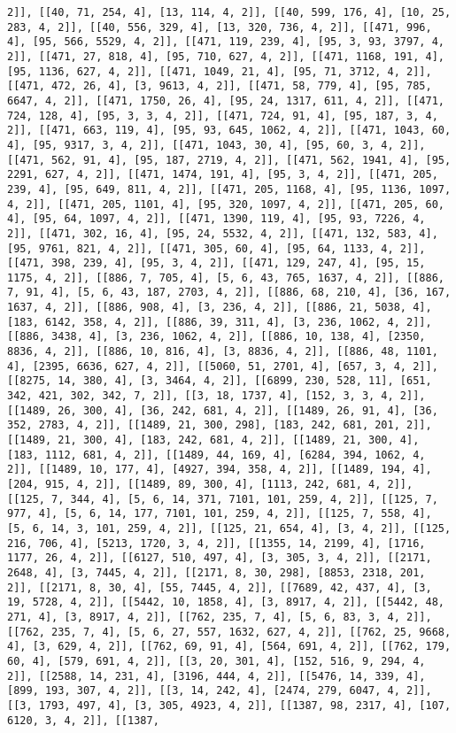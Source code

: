 \documentclass[12pt,fleqn]{article}\usepackage{../../common}
\begin{document}
\begin{verbatim}
2]], [[40, 71, 254, 4], [13, 114, 4, 2]], [[40, 599, 176, 4], [10, 25, 283, 4, 2]], [[40, 556, 329, 4], [13, 320, 736, 4, 2]], [[471, 996, 4], [95, 566, 5529, 4, 2]], [[471, 119, 239, 4], [95, 3, 93, 3797, 4, 2]], [[471, 27, 818, 4], [95, 710, 627, 4, 2]], [[471, 1168, 191, 4], [95, 1136, 627, 4, 2]], [[471, 1049, 21, 4], [95, 71, 3712, 4, 2]], [[471, 472, 26, 4], [3, 9613, 4, 2]], [[471, 58, 779, 4], [95, 785, 6647, 4, 2]], [[471, 1750, 26, 4], [95, 24, 1317, 611, 4, 2]], [[471, 724, 128, 4], [95, 3, 3, 4, 2]], [[471, 724, 91, 4], [95, 187, 3, 4, 2]], [[471, 663, 119, 4], [95, 93, 645, 1062, 4, 2]], [[471, 1043, 60, 4], [95, 9317, 3, 4, 2]], [[471, 1043, 30, 4], [95, 60, 3, 4, 2]], [[471, 562, 91, 4], [95, 187, 2719, 4, 2]], [[471, 562, 1941, 4], [95, 2291, 627, 4, 2]], [[471, 1474, 191, 4], [95, 3, 4, 2]], [[471, 205, 239, 4], [95, 649, 811, 4, 2]], [[471, 205, 1168, 4], [95, 1136, 1097, 4, 2]], [[471, 205, 1101, 4], [95, 320, 1097, 4, 2]], [[471, 205, 60, 4], [95, 64, 1097, 4, 2]], [[471, 1390, 119, 4], [95, 93, 7226, 4, 2]], [[471, 302, 16, 4], [95, 24, 5532, 4, 2]], [[471, 132, 583, 4], [95, 9761, 821, 4, 2]], [[471, 305, 60, 4], [95, 64, 1133, 4, 2]], [[471, 398, 239, 4], [95, 3, 4, 2]], [[471, 129, 247, 4], [95, 15, 1175, 4, 2]], [[886, 7, 705, 4], [5, 6, 43, 765, 1637, 4, 2]], [[886, 7, 91, 4], [5, 6, 43, 187, 2703, 4, 2]], [[886, 68, 210, 4], [36, 167, 1637, 4, 2]], [[886, 908, 4], [3, 236, 4, 2]], [[886, 21, 5038, 4], [183, 6142, 358, 4, 2]], [[886, 39, 311, 4], [3, 236, 1062, 4, 2]], [[886, 3438, 4], [3, 236, 1062, 4, 2]], [[886, 10, 138, 4], [2350, 8836, 4, 2]], [[886, 10, 816, 4], [3, 8836, 4, 2]], [[886, 48, 1101, 4], [2395, 6636, 627, 4, 2]], [[5060, 51, 2701, 4], [657, 3, 4, 2]], [[8275, 14, 380, 4], [3, 3464, 4, 2]], [[6899, 230, 528, 11], [651, 342, 421, 302, 342, 7, 2]], [[3, 18, 1737, 4], [152, 3, 3, 4, 2]], [[1489, 26, 300, 4], [36, 242, 681, 4, 2]], [[1489, 26, 91, 4], [36, 352, 2783, 4, 2]], [[1489, 21, 300, 298], [183, 242, 681, 201, 2]], [[1489, 21, 300, 4], [183, 242, 681, 4, 2]], [[1489, 21, 300, 4], [183, 1112, 681, 4, 2]], [[1489, 44, 169, 4], [6284, 394, 1062, 4, 2]], [[1489, 10, 177, 4], [4927, 394, 358, 4, 2]], [[1489, 194, 4], [204, 915, 4, 2]], [[1489, 89, 300, 4], [1113, 242, 681, 4, 2]], [[125, 7, 344, 4], [5, 6, 14, 371, 7101, 101, 259, 4, 2]], [[125, 7, 977, 4], [5, 6, 14, 177, 7101, 101, 259, 4, 2]], [[125, 7, 558, 4], [5, 6, 14, 3, 101, 259, 4, 2]], [[125, 21, 654, 4], [3, 4, 2]], [[125, 216, 706, 4], [5213, 1720, 3, 4, 2]], [[1355, 14, 2199, 4], [1716, 1177, 26, 4, 2]], [[6127, 510, 497, 4], [3, 305, 3, 4, 2]], [[2171, 2648, 4], [3, 7445, 4, 2]], [[2171, 8, 30, 298], [8853, 2318, 201, 2]], [[2171, 8, 30, 4], [55, 7445, 4, 2]], [[7689, 42, 437, 4], [3, 19, 5728, 4, 2]], [[5442, 10, 1858, 4], [3, 8917, 4, 2]], [[5442, 48, 271, 4], [3, 8917, 4, 2]], [[762, 235, 7, 4], [5, 6, 83, 3, 4, 2]], [[762, 235, 7, 4], [5, 6, 27, 557, 1632, 627, 4, 2]], [[762, 25, 9668, 4], [3, 629, 4, 2]], [[762, 69, 91, 4], [564, 691, 4, 2]], [[762, 179, 60, 4], [579, 691, 4, 2]], [[3, 20, 301, 4], [152, 516, 9, 294, 4, 2]], [[2588, 14, 231, 4], [3196, 444, 4, 2]], [[5476, 14, 339, 4], [899, 193, 307, 4, 2]], [[3, 14, 242, 4], [2474, 279, 6047, 4, 2]], [[3, 1793, 497, 4], [3, 305, 4923, 4, 2]], [[1387, 98, 2317, 4], [107, 6120, 3, 4, 2]], [[1387, 
\end{verbatim}
\end{document}
